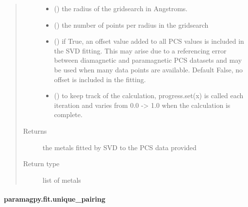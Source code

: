 \documentclass[a4paper,10pt,english]{sphinxmanual}
\begin{document}
\begin{fulllineitems}
\begin{quote}
\begin{description}
\begin{itemize}
\item {} 
 (\sphinxstyleliteralemphasis{\sphinxupquote{, }}) \textendash{} the radius of the gridsearch in Angstroms.

\item {} 
 (\sphinxstyleliteralemphasis{\sphinxupquote{, }}) \textendash{} the number of points per radius in the gridsearch

\item {} 
 (\sphinxstyleliteralemphasis{\sphinxupquote{, }}) \textendash{} if True, an offset value added to all PCS values is included in
the SVD fitting. This may arise due to a referencing error between
diamagnetic and paramagnetic PCS datasets and may be used when
many data points are available.
Default False, no offset is included in the fitting.

\item {} 
 (\sphinxstyleliteralemphasis{\sphinxupquote{, }}) \textendash{} to keep track of the calculation, progress.set(x) is called each
iteration and varies from 0.0 -\textgreater{} 1.0 when the calculation is complete.

\end{itemize}

\item[{Returns}] \leavevmode
{} \textendash{} the metals fitted by SVD to the PCS data provided

\item[{Return type}] \leavevmode
list of metals

\end{description}\end{quote}

\end{fulllineitems}



\paragraph{paramagpy.fit.unique\_pairing}
\label{\detokenize{reference/generated/paramagpy.fit.unique_pairing:paramagpy-fit-unique-pairing}}\label{\detokenize{reference/generated/paramagpy.fit.unique_pairing::doc}}
\end{document}
